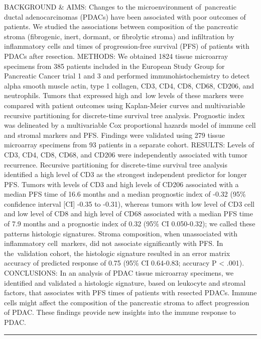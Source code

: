 \documentclass[]{article}
\begin{document}
BACKGROUND \& AIMS: Changes to the microenvironment of~pancreatic ductal
adenocarcinomas (PDACs) have been associated with poor outcomes of
patients. We studied the associations between composition of the
pancreatic stroma (fibrogenic, inert, dormant, or fibrolytic stroma) and
infiltration by inflammatory cells and times of progression-free
survival (PFS) of patients with PDACs after resection. METHODS: We
obtained 1824 tissue microarray specimens from 385 patients included in
the European Study Group for Pancreatic Cancer trial 1 and 3 and
performed immunohistochemistry to detect alpha smooth muscle actin, type
1 collagen, CD3, CD4, CD8, CD68, CD206, and neutrophils. Tumors that
expressed high and~low levels of these markers were compared with
patient outcomes using Kaplan-Meier curves and multivariable recursive
partitioning for discrete-time survival tree analysis. Prognostic index
was delineated by a multivariable Cox proportional hazards model of
immune cell and stromal markers and PFS. Findings were validated using
279 tissue microarray specimens from 93 patients in a separate cohort.
RESULTS: Levels of CD3, CD4, CD8, CD68, and CD206 were independently
associated with tumor recurrence. Recursive partitioning for
discrete-time survival tree analysis identified a high level of CD3 as
the strongest independent predictor for longer PFS. Tumors with levels
of CD3 and high levels of CD206 associated with a median PFS time of
16.6 months and a median prognostic index of -0.32 (95\% confidence
interval {[}CI{]} -0.35 to -0.31), whereas tumors with low level of CD3
cell and low level of CD8 and high level of CD68 associated with a
median PFS time of 7.9 months and a prognostic index of 0.32 (95\% CI
0.050-0.32); we called these patterns histologic signatures. Stroma
composition, when unassociated with inflammatory cell~markers, did not
associate significantly with PFS. In the~validation cohort, the
histologic signature resulted in an error matrix accuracy of predicted
response of 0.75 (95\% CI 0.64-0.83; accuracy P \textless{} .001).
CONCLUSIONS: In an analysis of PDAC tissue microarray specimens, we
identified and validated a histologic signature, based on leukocyte and
stromal factors, that associates with PFS times of patients with
resected PDACs. Immune cells might affect the composition of the
pancreatic stroma to affect progression of PDAC. These findings provide
new insights into the immune response to PDAC.

{}

{}

\begin{center}\rule{0.5\linewidth}{\linethickness}\end{center}
\end{document}
